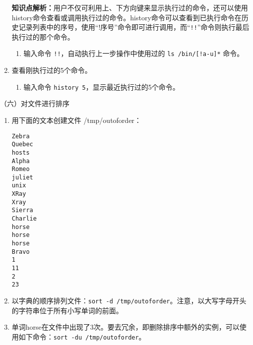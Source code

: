 \begin{enumerate}
    \textbf{知识点解析：}用户不仅可利用上、下方向键来显示执行过的命令，还可以使用history命令查看或调用执行过的命令。history命令可以查看到已执行命令在历史记录列表中的序号，使用“!序号”命令即可进行调用，而“\verb|!!|”命令则执行最后执行过的那个命令。
    \begin{enumerate}
      \item 输入命令 \verb|!!|，自动执行上一步操作中使用过的 \verb|ls /bin/[!a-u]*| 命令。
    \end{enumerate}
  \item 查看刚执行过的5个命令。
    \begin{enumerate}
      \item 输入命令 \verb|history 5|，显示最近执行过的5个命令。
    \end{enumerate}
\end{enumerate}

\vspace{0.1in}
（六）对文件进行排序
\begin{enumerate}
  \item 用下面的文本创建文件 /tmp/outoforder：
\begin{verbatim}
Zebra
Quebec
hosts
Alpha
Romeo
juliet
unix
XRay
Xray
Sierra
Charlie
horse
horse
horse
Bravo
1
11
2
23
\end{verbatim}
  \item 以字典的顺序排列文件：\verb|sort -d /tmp/outoforder|。注意，以大写字母开头的字符串位于所有小写单词的前面。
  \item 单词horse在文件中出现了3次。要去冗余，即删除排序中额外的实例，可以使用如下命令：\verb|sort -du /tmp/outoforder|。
\end{enumerate}

